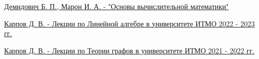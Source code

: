 \documentclass{article}
\begin{document}
\begin{thebibliography}{9}

    \href{
        https://ikfia.ysn.ru/wp-content/uploads/2018/01/DemidovichMaron1966ru.pdf
    }{
        Демидович Б. П., Марон И. А. - "Основы вычислительной математики"
    }

    \href{
        https://logic.pdmi.ras.ru/~dvk/ITMO/Algebra/2022-23/5_Lin_space.pdf
    }{
        Карпов Д. В. - Лекции по Линейной алгебре в университете ИТМО
        2022 - 2023 гг.
    }

    \href{
        https://logic.pdmi.ras.ru/~dvk/ITMO/DM/2021-22/3_matchings.pdf
    }{
        Карпов Д. В. - Лекции по Теории графов в университете ИТМО
        2021 - 2022 гг.
    }

\end{thebibliography}
\end{document}
